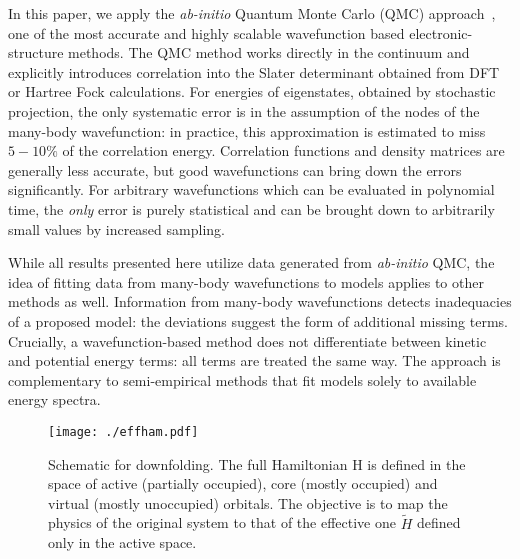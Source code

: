 \documentclass[aip,jcp,twocolumn,10pt]{revtex4-1}
\begin{document}
In this paper, we apply the \emph{ab-initio} 
Quantum Monte Carlo (QMC) approach~\cite{Ceperley_Alder,Foulkes_review}, 
one of the most accurate and highly scalable wavefunction based electronic-structure 
methods. The QMC method works directly in the continuum and 
explicitly introduces correlation into the Slater determinant obtained 
from DFT or Hartree Fock calculations. For energies of eigenstates, obtained 
by stochastic projection, the only systematic error is in the assumption of the 
nodes of the many-body wavefunction: in practice, 
this approximation is estimated to miss $ 5 - 10 \%$ 
of the correlation energy. Correlation functions and density matrices are generally 
less accurate, but good wavefunctions can bring down the errors significantly. 
For arbitrary wavefunctions which can be evaluated in polynomial time, 
the \emph{only} error is purely statistical and 
can be brought down to arbitrarily small values by increased sampling.

While all results presented here utilize data generated from 
\emph{ab-initio} QMC, the idea of fitting data from many-body wavefunctions to models applies 
to other methods as well. Information from many-body wavefunctions detects 
inadequacies of a proposed model: the deviations suggest the form of additional missing terms. 
Crucially, a wavefunction-based method does not differentiate between kinetic 
and potential energy terms: all terms are treated the same way. 
The approach is complementary to semi-empirical methods that 
fit models solely to available energy spectra. 

\begin{figure}[htpb]
\centering
\texttt{[image: ./effham.pdf]}
\caption{Schematic for downfolding. The full Hamiltonian H is defined in the space of active (partially occupied), 
core (mostly occupied) and virtual (mostly unoccupied) orbitals. The objective is to map the physics 
of the original system to that of the effective one $\tilde{H}$ defined only in the active space.}
\label{fig:effham} 
\end{figure}	
\end{document}
